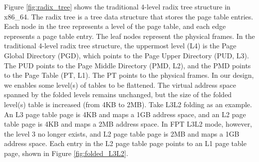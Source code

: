 Figure \ref{fig:radix_tree} shows the traditional 4-level radix tree structure in x86\_64. The radix tree is a tree data structure that stores the page table entries. Each node in the tree represents a level of the page table, and each edge represents a page table entry. The leaf nodes represent the physical frames. In the traditional 4-level radix tree structure, the uppermost level (L4) is the Page Global Directory (PGD), which points to the Page Upper Directory (PUD, L3). The PUD points to the Page Middle Directory (PMD, L2), and the PMD points to the Page Table (PT, L1). The PT points to the physical frames. In our design, we enables some level(s) of tables to be flattened. The virtual address space spanned by the folded levels remains unchanged, but the size of the folded level(s) table is increased (from 4KB to 2MB). Take L3L2 folding as an example. An L3 page table page is 4KB and maps a 1GB address space, and an L2 page table page is 4KB and maps a 2MB address space. In FPT L3L2 mode, however, the level 3 no longer exists, and L2 page table page is 2MB and maps a 1GB address space. Each entry in the L2 page table page points to an L1 page table page, shown in Figure \ref{fig:folded_L3L2}.
